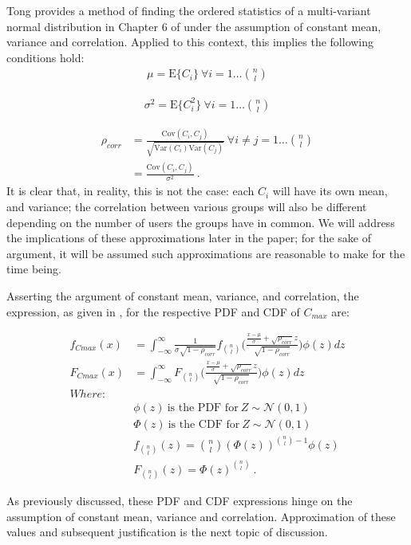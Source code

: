 Tong provides a method of finding the ordered statistics of a multi-variant normal distribution in Chapter 6 of \cite{Tong1990} under the assumption of constant mean, variance and correlation. Applied to this context, this implies the following conditions hold:
\begin{equation}
    \begin{aligned}
        \mu = \text{E}\lbrace C_i \rbrace \ \forall i = 1\ldots \binom{n}{l}
    \end{aligned}
\end{equation}

\begin{equation}
    \begin{aligned}
        \sigma^2 = \text{E}\lbrace C_i^2 \rbrace \ \forall i = 1\ldots \binom{n}{l}
    \end{aligned}
\end{equation}

\begin{equation}
    \begin{aligned}
        \rho_{corr} &= \frac{\text{Cov}(C_i,C_j)}{\sqrt{\text{Var}(C_i)\text{Var}(C_j)}}\ \forall i\neq j = 1\ldots\binom{n}{l} \\
        &= \frac{\text{Cov}(C_i,C_j)}{\sigma^2}\ .
    \end{aligned}
\end{equation}
It is clear that, in reality, this is not the case: each $C_i$ will have its own mean, and variance; the correlation between various groups will also be different depending on the number of users the groups have in common. We will address the implications of these approximations later in the paper; for the sake of argument, it will be assumed such approximations are reasonable to make for the time being.

Asserting the argument of constant mean, variance, and correlation, the expression, as given in \cite{Tong1990}, for the respective PDF and CDF of $C_{max}$ are:

 
 \begin{equation}\label{eq:pdf_max}
    \begin{aligned}
        f_{Cmax}(x) &= \int_{-\infty}^{\infty}\frac{1}{\sigma\sqrt{1-\rho_{corr}}}f_{\binom{n}{l}}\bigg(\frac{\frac{x-\mu}{\sigma}+\sqrt{\rho_{corr}}z}{\sqrt{1-\rho_{corr}}}\bigg)\phi(z)dz \\
        F_{Cmax}(x) &= \int_{-\infty}^{\infty}F_{\binom{n}{l}}\bigg(\frac{\frac{x-\mu}{\sigma}+\sqrt{\rho_{corr}}z}{\sqrt{1-\rho_{corr}}}\bigg)\phi(z)dz \\
        Where:\\
        &\phi(z)\ \text{is the PDF for}\ Z\sim\mathcal{N}(0,1)\\
        &\Phi(z)\ \text{is the CDF for}\ Z\sim\mathcal{N}(0,1)\\
        &f_{\binom{n}{l}}(z) = \binom{n}{l}(\Phi(z))^{\binom{n}{l}-1}\phi(z)\\
        &F_{\binom{n}{l}}(z) = \Phi(z)^{\binom{n}{l}} \ .
    \end{aligned}
\end{equation}

As previously discussed, these PDF and CDF expressions hinge on the assumption of constant mean, variance and correlation. Approximation of these values and subsequent justification is the next topic of discussion.